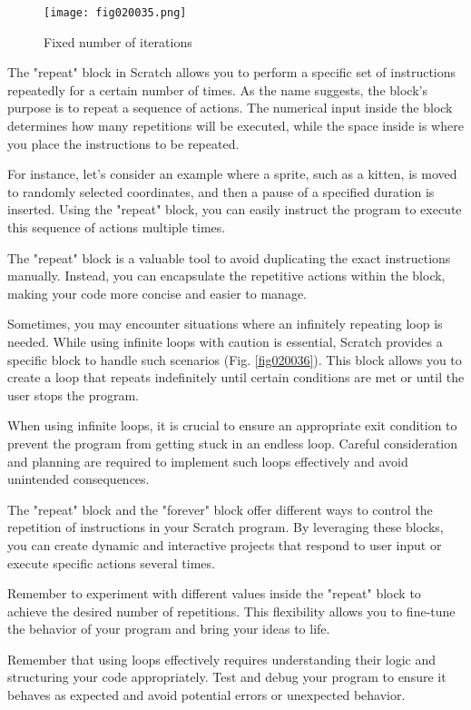 \begin{figure}[H]
   \centering
   \texttt{[image: fig020035.png]}
   \caption{Fixed number of iterations}
\label{fig020035}
\end{figure}

The "repeat" block in Scratch allows you to perform a specific set of instructions repeatedly for a certain number of times. As the name suggests, the block's purpose is to repeat a sequence of actions. The numerical input inside the block determines how many repetitions will be executed, while the space inside is where you place the instructions to be repeated. 

For instance, let's consider an example where a sprite, such as a kitten, is moved to randomly selected coordinates, and then a pause of a specified duration is inserted. Using the "repeat" block, you can easily instruct the program to execute this sequence of actions multiple times.

The "repeat" block is a valuable tool to avoid duplicating the exact instructions manually. Instead, you can encapsulate the repetitive actions within the block, making your code more concise and easier to manage.

Sometimes, you may encounter situations where an infinitely repeating loop is needed. While using infinite loops with caution is essential, Scratch provides a specific block to handle such scenarios (Fig. \ref{fig020036}). This block allows you to create a loop that repeats indefinitely until certain conditions are met or until the user stops the program.

When using infinite loops, it is crucial to ensure an appropriate exit condition to prevent the program from getting stuck in an endless loop. Careful consideration and planning are required to implement such loops effectively and avoid unintended consequences.

The "repeat" block and the "forever" block offer different ways to control the repetition of instructions in your Scratch program. By leveraging these blocks, you can create dynamic and interactive projects that respond to user input or execute specific actions several times.

Remember to experiment with different values inside the "repeat" block to achieve the desired number of repetitions. This flexibility allows you to fine-tune the behavior of your program and bring your ideas to life.

Remember that using loops effectively requires understanding their logic and structuring your code appropriately. Test and debug your program to ensure it behaves as expected and avoid potential errors or unexpected behavior.

